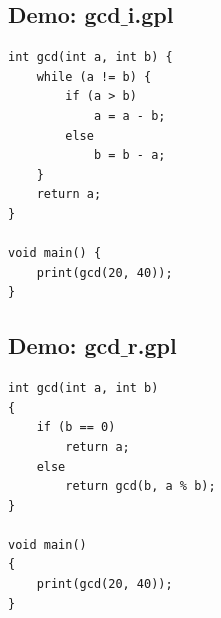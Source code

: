 \documentclass[a4paper,12pt]{article}
\begin{document}
\subsection{Demo: gcd$\_$i.gpl}
\begin{lstlisting}
int gcd(int a, int b) {
	while (a != b) {
		if (a > b)
			a = a - b;
		else
			b = b - a;
	}
	return a;
}

void main() {
	print(gcd(20, 40));
}
\end{lstlisting}

\subsection{Demo: gcd$\_$r.gpl}
\begin{lstlisting}
int gcd(int a, int b) 
{
	if (b == 0)
		return a;
	else
		return gcd(b, a % b);
}

void main() 
{
	print(gcd(20, 40));
}
\end{lstlisting}
\end{document}
